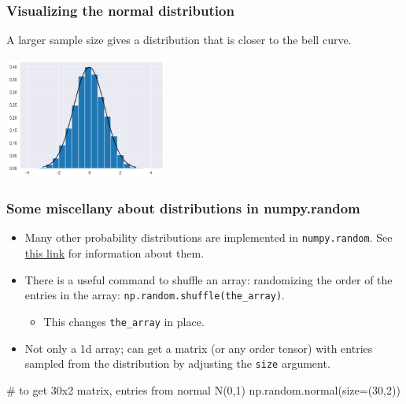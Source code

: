 \documentclass{beamer}
\newenvironment{codeblock}
    {\hfill\begin{beamerboxesrounded}[lower=codecol, width=0.8\textwidth]
    \medskip

    }
    { 
    \end{beamerboxesrounded}\hfill
    }
\theoremstyle{example}
\newcommand{\ct}[1]{\lstinline[language=Python]!#1!}
\newcommand{\ttt}[1]{{\small\texttt{#1}}}
\begin{document}

\begin{frame}[fragile]
\frametitle{Visualizing the normal distribution}
    
A larger sample size gives a distribution that is closer to the bell curve.
    
\centering
\includegraphics[width=0.4\textwidth]{histogram_of_sample4.png}
    
\end{frame}

\begin{frame}[fragile]
\frametitle{Some miscellany about distributions in {\ttm numpy.random}}
\begin{itemize}
    \item Many other probability distributions are implemented in \ttt{numpy.random}. See \href{https://numpy.org/doc/2.1/reference/random/legacy.html#distributions}{this link} for information about them.
    
    \item There is a useful command to shuffle an array: randomizing the order of the entries in the array: \ttt{np.random.shuffle(the}\ct{_}\ttt{array)}.
    \begin{itemize}
        \item This changes \ttt{the}\ct{_}\ttt{array} in place.
    \end{itemize}

    \item Not only a 1d array; can get a matrix (or any order tensor) with entries sampled from the distribution by adjusting the \ttt{size} argument.
\end{itemize}

\begin{codeblock}

\begin{python}
# to get 30x2 matrix, entries from normal N(0,1)
np.random.normal(size=(30,2))
\end{python}

\end{codeblock}

\end{frame}
\end{document}
